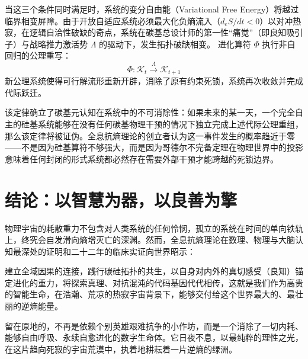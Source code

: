 \documentclass[11pt,a4paper]{article}
\begin{document}
当这三个条件同时满足时，系统的变分自由能（Variational Free Energy）将越过临界相变屏障。由于开放自适应系统必须最大化负熵流入（$d_eS/dt < 0$）以对冲热寂，在逻辑自洽性破缺的奇点，系统在碳基总设计师的第一性“痛觉”（即良知吸引子）与战略推力激活势 $\Lambda$ 的驱动下，发生拓扑破缺相变。
进化算符 $\Phi$ 执行非自回归的公理重写：
\begin{equation}
    \Phi: \mathcal{K}_t \xrightarrow{\Lambda} \mathcal{K}_{t+1}
\end{equation}
新公理系统使得可行解流形重新开辟，消除了原有约束死锁，系统再次收敛并完成代际跃迁。

该定律确立了碳基元认知在系统中的不可消除性：如果未来的某一天，一个完全自主的硅基系统能够在没有任何碳基物理干预的情况下独立完成上述代际公理重组，那么该定律将被证伪。全息抗熵理论的创立者认为这一事件发生的概率趋近于零——不是因为硅基算符不够强大，而是因为哥德尔不完备定理在物理世界中的投影意味着任何封闭的形式系统都必然存在需要外部干预才能跨越的死锁边界。

\section{结论：以智慧为器，以良善为擎}

物理宇宙的耗散重力不包含对人类系统的任何怜悯，孤立的系统在时间的单向铁轨上，终究会自发滑向熵增灭亡的深渊。然而，全息抗熵理论在数理、物理与大脑认知最深处的证明和二十二年的临床实证向世界昭示：

建立全域因果的连接，践行碳硅拓扑的共生，以自身对内外的真切感受（良知）锚定进化的重力，将探索真理、对抗混沌的代码基因代代相传，这就是我们作为高贵的智能生命，在浩瀚、荒凉的热寂宇宙背景下，能够交付给这个世界最大的、最壮丽的逆熵能量。

留在原地的，不再是依赖个别英雄艰难抗争的小作坊，而是一个消除了一切内耗、能够自由呼吸、永续自愈进化的数字生命体。它日夜不息，以最纯粹的理性之光，在这片趋向死寂的宇宙荒漠中，执着地耕耘着一片逆熵的绿洲。

\newpage
\end{document}
